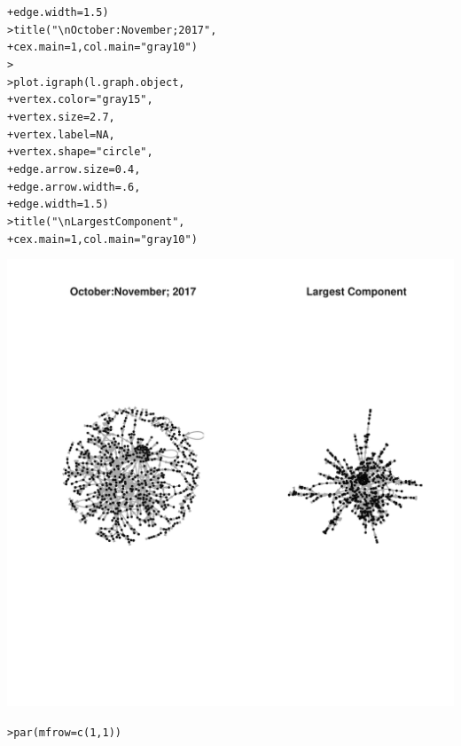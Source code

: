 \documentclass[12pt]{article}\usepackage[]{graphicx}\usepackage[]{color}
\makeatletter
\newcommand{\hlnum}[1]{\textcolor[rgb]{0.82,0.78,0.62}{#1}}%
\newcommand{\hlstr}[1]{\textcolor[rgb]{0.82,0.78,0.62}{#1}}%
\newcommand{\hlstd}[1]{\textcolor[rgb]{0.882,0.878,0.898}{#1}}%
\newcommand{\hlkwc}[1]{\textcolor[rgb]{0.812,0.522,0.388}{#1}}%
\newcommand{\hlkwd}[1]{\textcolor[rgb]{0.733,0.388,0.812}{#1}}%
\newenvironment{kframe}{%
 \def\at@end@of@kframe{}%
 \ifinner\ifhmode%
  \def\at@end@of@kframe{\end{minipage}}%
  \begin{minipage}{\columnwidth}%
 \fi\fi%
 \def\FrameCommand##1{\hskip\@totalleftmargin \hskip-\fboxsep
 \colorbox{shadecolor}{##1}\hskip-\fboxsep
     \hskip-\linewidth \hskip-\@totalleftmargin \hskip\columnwidth}%
 \MakeFramed {\advance\hsize-\width
   \@totalleftmargin\z@ \linewidth\hsize
   \@setminipage}}%
 {\par\unskip\endMakeFramed%
 \at@end@of@kframe}
\newenvironment{knitrout}{}{} %
\makeatother
\begin{document}
\begin{flushleft}
\begin{center}
\begin{knitrout}
\begin{kframe}
\begin{alltt}
\hlstd{+ }            \hlkwc{edge.width}\hlstd{=}\hlnum{1.5}\hlstd{)}
\hlstd{> }\hlkwd{title}\hlstd{(}\hlstr{"\textbackslash{}n October:November; 2017"}\hlstd{,}
\hlstd{+ }      \hlkwc{cex.main}\hlstd{=}\hlnum{1}\hlstd{,} \hlkwc{col.main}\hlstd{=}\hlstr{"gray10"}\hlstd{)}
\hlstd{> }
\hlstd{> }\hlkwd{plot.igraph}\hlstd{(l.graph.object,}
\hlstd{+ }            \hlkwc{vertex.color}\hlstd{=}\hlstr{"gray15"}\hlstd{,}
\hlstd{+ }            \hlkwc{vertex.size}\hlstd{=}\hlnum{2.7}\hlstd{,}
\hlstd{+ }            \hlkwc{vertex.label}\hlstd{=}\hlnum{NA}\hlstd{,}
\hlstd{+ }            \hlkwc{vertex.shape}\hlstd{=}\hlstr{"circle"}\hlstd{,}
\hlstd{+ }            \hlkwc{edge.arrow.size}\hlstd{=}\hlnum{0.4}\hlstd{,}
\hlstd{+ }            \hlkwc{edge.arrow.width}\hlstd{=}\hlnum{.6}\hlstd{,}
\hlstd{+ }            \hlkwc{edge.width}\hlstd{=}\hlnum{1.5}\hlstd{)}
\hlstd{> }\hlkwd{title}\hlstd{(}\hlstr{"\textbackslash{}n Largest Component"}\hlstd{,}
\hlstd{+ }      \hlkwc{cex.main}\hlstd{=}\hlnum{1}\hlstd{,} \hlkwc{col.main}\hlstd{=}\hlstr{"gray10"}\hlstd{)}
\end{alltt}
\end{kframe}
\includegraphics[width=6in]{figure/starting-1} 
\begin{kframe}\begin{alltt}
\hlstd{> }\hlkwd{par}\hlstd{(}\hlkwc{mfrow}\hlstd{=}\hlkwd{c}\hlstd{(}\hlnum{1}\hlstd{,}\hlnum{1}\hlstd{))}
\end{alltt}
\end{kframe}
\end{knitrout}
\end{center}


\end{flushleft}
\end{document}
